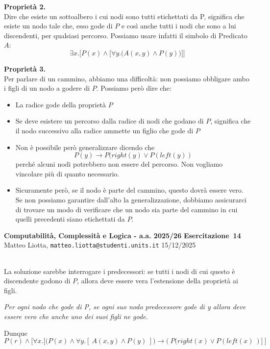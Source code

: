 \documentclass[a4paper,10pt]{article}
\makeatletter
\newcommand{\EsercitazioneNum}{14}
\newcommand{\Data}{15/12/2025}
\newcommand{\DocType}{Esercitazione} %
\newcommand{\FullTitle}{\DocType\ \EsercitazioneNum}
\newcommand{\Header}{
\noindent
  \small \textbf{Computabilità, Complessità e Logica - a.a. 2025/26} \hfill \textbf{\FullTitle} \\[0.2cm]
  \scriptsize Matteo Liotta, \texttt{matteo.liotta@studenti.units.it} \hfill \Data \\[0.2cm]
  \noindent\makebox[\linewidth]{\rule{\linewidth}{0.4pt}} \\[0.3cm]}
\newcommand{\NewPageHeader}{
  \vfill
  \noindent\makebox[\linewidth]{\rule{\linewidth}{0.4pt}}
  \newpage
  {\Header}
}
\makeatother
\begin{document}
{\begin{itemize}[label=, leftmargin=0pt]
\begin{osservazioni}
    \textbf{Proprietà 2.}\\
    Dire che esiste un sottoalbero i cui nodi sono tutti etichettati da P, significa che esiste un nodo tale che, esso gode di $P$ e così anche tutti i nodi che sono a lui discendenti, per qualsiasi percorso. Possiamo usare infatti il simbolo di Predicato $A$:
    $$\exists x. \bigg[P(x)\land\bigg[\forall y.\bigg(A(x,y) \land P(y)\bigg)\bigg]\bigg]$$

    \textbf{Proprietà 3.}\\
    Per parlare di un cammino, abbiamo una difficoltà: non possiamo obbligare ambo i figli di un nodo a godere di $P$. Possiamo però dire che:
    \begin{itemize}
        \item La radice gode della proprietà $P$
        \item Se deve esistere un percorso dalla radice di nodi che godano di $P$, significa che il nodo successivo alla radice ammette un figlio che gode di $P$
        \item Non è possibile però generalizzare dicendo che $$P(y)\rightarrow P(right(y)\lor P(left(y))$$perché alcuni nodi potrebbero non essere del percorso. Non vogliamo vincolare più di quanto necessario.
        \item Sicuramente però, se il nodo è parte del cammino, questo dovrà essere vero. Se non possiamo garantire dall'alto la generalizzazione, dobbiamo assicurarci di trovare un modo di verificare che un nodo sia parte del cammino in cui quelli precedenti siano etichettati da $P$. 
    \end{itemize}
    \end{osservazioni}
    \NewPageHeader
    \begin{osservazioni}
    La soluzione sarebbe interrogare i predecessori: se tutti i nodi di cui questo è discendente godono di $P$, allora deve essere vera l'estensione della proprietà ai figli.

    \textit{Per ogni nodo che gode di P, se ogni suo nodo predecessore gode di y allora deve essere vero che anche uno dei suoi figli ne gode.}
    
    Dunque
    $$P(r)\land\bigg[\forall x. \bigg[\bigg(P(x)\land \forall y.[\ A(x,y) \land P(y)\ ]\bigg)\rightarrow(\ P(right(x)\lor P(left(x)\ )\bigg]\ \bigg]$$
    \end{osservazioni}


\end{itemize}}
\end{document}
